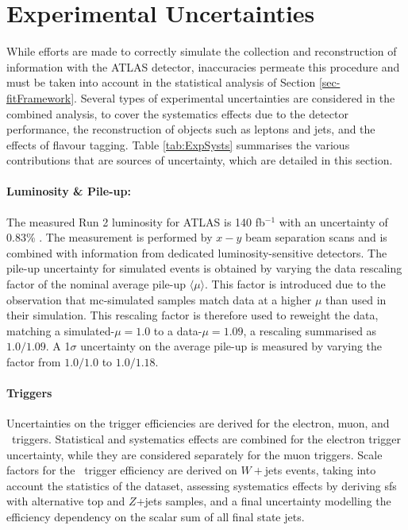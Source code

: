 \section{Experimental Uncertainties}\label{sec-unc} %
While efforts are made to correctly simulate the collection and reconstruction of information with the ATLAS detector, inaccuracies permeate this procedure and must be taken into account in the statistical analysis of Section \ref{sec-fitFramework}. Several types of experimental uncertainties are considered in the combined analysis, to cover the systematics effects due to the detector performance, the reconstruction of objects such as leptons and jets, and the effects of flavour tagging. Table \ref{tab:ExpSysts} summarises the various contributions that are sources of uncertainty, which are detailed in this section.


\paragraph{Luminosity \& Pile-up:} The measured Run 2 luminosity for ATLAS is 140 fb$^{-1}$ with an uncertainty of 0.83\% \cite{ATLAS:2022hro}. The measurement is performed by $x-y$ beam separation scans and is combined with information from dedicated luminosity-sensitive detectors. The pile-up uncertainty for simulated events is obtained by varying the data rescaling factor of the nominal average pile-up $\langle \mu \rangle$. This factor is introduced due to the observation that \gls{mc}-simulated samples match data at a higher $\mu$ than used in their simulation. This rescaling factor is therefore used to reweight the data, matching a simulated-$\mu = 1.0$ to a data-$\mu = 1.09$, a rescaling summarised as $1.0/1.09$. A 1$\sigma$ uncertainty on the average pile-up is measured by varying the factor from $1.0/1.0$ to $1.0/1.18$. %

\paragraph{Triggers} Uncertainties on the trigger efficiencies are derived for the electron, muon, and \etm\ triggers. Statistical and systematics effects are combined for the electron trigger uncertainty, while they are considered separately for the muon triggers. Scale factors for the \etm\ trigger efficiency are derived on $W+$jets events, taking into account the statistics of the dataset, assessing systematics effects by deriving \gls{sf}s with alternative top and $Z$+jets samples, and a final uncertainty modelling the efficiency dependency on the scalar sum of all final state jets. %

